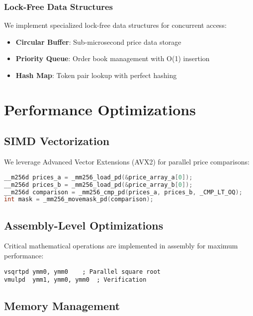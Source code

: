 \documentclass[12pt]{article}
\begin{document}
\subsubsection{Lock-Free Data Structures}

We implement specialized lock-free data structures for concurrent access:

\begin{itemize}
    \item \textbf{Circular Buffer}: Sub-microsecond price data storage
    \item \textbf{Priority Queue}: Order book management with O(1) insertion
    \item \textbf{Hash Map}: Token pair lookup with perfect hashing
\end{itemize}

\section{Performance Optimizations}

\subsection{SIMD Vectorization}

We leverage Advanced Vector Extensions (AVX2) for parallel price comparisons:

\begin{lstlisting}[language=C, caption=SIMD Price Comparison]
__m256d prices_a = _mm256_load_pd(&price_array_a[0]);
__m256d prices_b = _mm256_load_pd(&price_array_b[0]);
__m256d comparison = _mm256_cmp_pd(prices_a, prices_b, _CMP_LT_OQ);
int mask = _mm256_movemask_pd(comparison);
\end{lstlisting}

\subsection{Assembly-Level Optimizations}

Critical mathematical operations are implemented in assembly for maximum performance:

\begin{lstlisting}[language={[x86masm]Assembler}, caption=Optimized Square Root]
vsqrtpd ymm0, ymm0    ; Parallel square root
vmulpd  ymm1, ymm0, ymm0  ; Verification
\end{lstlisting}

\subsection{Memory Management}
\end{document}
